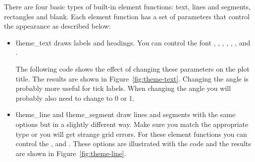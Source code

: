 There are four basic types of built-in element functions: text, lines and segments, rectangles and blank.  Each element function has a set of parameters that control the appearance as described below:

\begin{itemize}
  \item \f{theme_text} draws labels and headings. You can control the font , , , , , ,  and .  
  
  The following code shows the effect of changing these parameters on the plot title. The results are shown in Figure~\ref{fig:theme-text}. Changing the angle is probably more useful for tick labels.  When changing the angle you will probably also need to change  to 0 or 1.
  
    

  \item \f{theme_line} and \f{theme_segment} draw lines and segments with the same options but in a slightly different way.  Make sure you match the appropriate type or you will get strange grid errors.  For these element functions you can control the ,  and .  These options are illustrated with the code and the results are shown in Figure~\ref{fig:theme-line}.  

    


\end{itemize}
